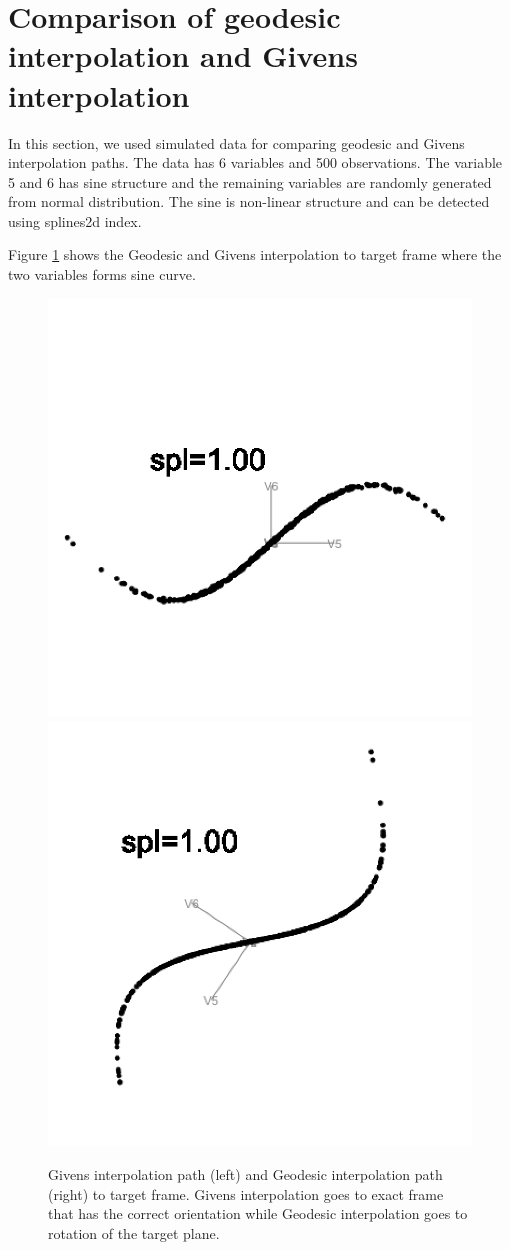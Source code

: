 \hypertarget{comparison-of-geodesic-interpolation-and-givens-interpolation}{%
\section{Comparison of geodesic interpolation and Givens interpolation}\label{comparison-of-geodesic-interpolation-and-givens-interpolation}}

In this section, we used simulated data for comparing geodesic and Givens interpolation paths. The data has 6 variables and 500 observations. The variable 5 and 6 has sine structure and the remaining variables are randomly generated from normal distribution. The sine is non-linear structure and can be detected using splines2d index.

Figure \ref{fig:compare-interpolations-static} shows the Geodesic and Givens interpolation to target frame where the two variables forms sine curve.

\begin{figure}

{\centering \includegraphics[width=0.5\linewidth]{given_sine} \includegraphics[width=0.5\linewidth]{geodesic_sine} 

}

\caption{Givens interpolation path (left) and Geodesic interpolation path (right) to target frame. Givens interpolation goes to exact frame that has the correct orientation while Geodesic interpolation goes to rotation of the target plane.}\label{fig:compare-interpolations-static}
\end{figure}

